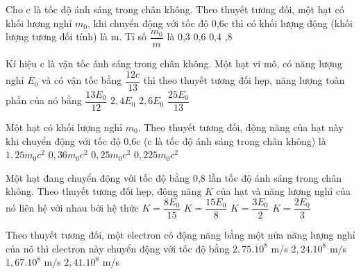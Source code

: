 \begin{vidu}%
	 Cho c là tốc độ ánh sáng trong chân không. Theo thuyết tương đối, một hạt có khối lượng nghỉ $m_0$, khi chuyển động với tốc độ 0,6c thì có khối lượng động (khối lượng tương đối tính) là m. Tỉ số $\dfrac {m_0}{m}$ là
	\choice
	{0,3}
	{0,6}
	{0,4}
	{,8}
\end{vidu}
\begin{vidu}%
	Kí hiệu c là vận tốc ánh sáng trong chân không. Một hạt vi mô, có năng lượng nghỉ $E_0$ và có vận tốc bằng $\dfrac{12c}{13}$ thì theo thuyết tương đối hẹp, năng lượng toàn phần của nó bằng
	\choice
	{$\dfrac{13{E_0}}{12}$}
	{$2,4{E_0}$}
	{\True $2,6{E_0}$}
	{$\dfrac{25E_0}{13}$}
\end{vidu}
\begin{vidu}%
	 Một hạt có khối lượng nghỉ $m_0$. Theo thuyết tương đối, động năng của hạt này khi chuyển động với tốc độ 0,6c (c là tốc độ ánh sáng trong chân không) là
	\choice
	{$1,25m_0c^2$}
	{$0,36m_0c^2$}
	{\True $0,25m_0c^2$}
	{$0,225m_0c^2$}
\end{vidu}
\begin{vidu}%
	 Một hạt đang chuyển động với tốc độ bằng 0,8 lần tốc độ ánh sáng trong chân không. Theo thuyết tương đối hẹp, động năng $K$ của hạt và năng lượng nghỉ  của nó liên hệ với nhau bởi hệ thức
	\choice
	{$K = \dfrac {8 E_0} {15}$}
	{$K = \dfrac {15 E_0} {8}$}
	{$K = \dfrac {3 E_0} {2}$}
	{\True $K = \dfrac {2 E_0} {3}$}
\end{vidu}
\begin{vidu}%
	 Theo thuyết tương đối, một electron có động năng bằng một nửa năng lượng nghỉ của nó thì electron này chuyển động với tốc độ bằng
	\choice
	{$2,75.10^8$ m/s}
	{\True $2,24.10^8$ m/s}
	{$1,67.10^8$ m/s}
	{$2,41.10^8$ m/s}
\end{vidu}